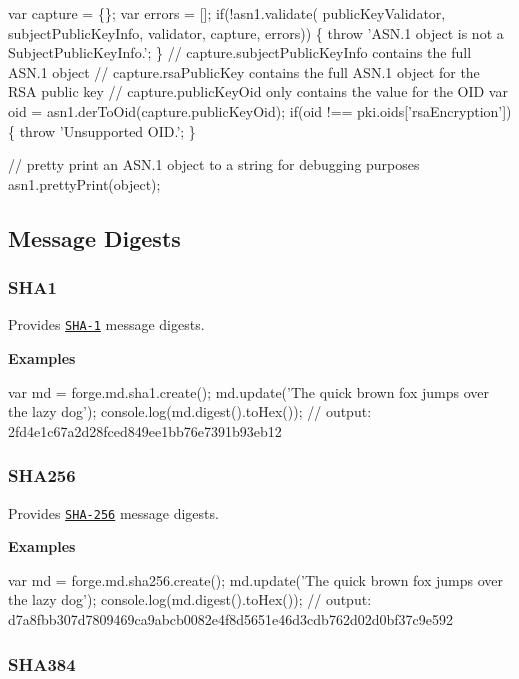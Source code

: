 \begin{DoxyCode}
var capture = \{\};
var errors = [];
if(!asn1.validate(
  publicKeyValidator, subjectPublicKeyInfo, validator, capture, errors)) \{
  throw 'ASN.1 object is not a SubjectPublicKeyInfo.';
\}
// capture.subjectPublicKeyInfo contains the full ASN.1 object
// capture.rsaPublicKey contains the full ASN.1 object for the RSA public key
// capture.publicKeyOid only contains the value for the OID
var oid = asn1.derToOid(capture.publicKeyOid);
if(oid !== pki.oids['rsaEncryption']) \{
  throw 'Unsupported OID.';
\}

// pretty print an ASN.1 object to a string for debugging purposes
asn1.prettyPrint(object);
\end{DoxyCode}
 

 \subsection*{Message Digests}

\label{_sha1}%
 \subsubsection*{S\+H\+A1}

Provides \href{http://en.wikipedia.org/wiki/SHA-1}{\tt S\+H\+A-\/1} message digests.

{\bfseries Examples}


\begin{DoxyCode}
var md = forge.md.sha1.create();
md.update('The quick brown fox jumps over the lazy dog');
console.log(md.digest().toHex());
// output: 2fd4e1c67a2d28fced849ee1bb76e7391b93eb12
\end{DoxyCode}


\label{_sha256}%
 \subsubsection*{S\+H\+A256}

Provides \href{http://en.wikipedia.org/wiki/SHA-256}{\tt S\+H\+A-\/256} message digests.

{\bfseries Examples}


\begin{DoxyCode}
var md = forge.md.sha256.create();
md.update('The quick brown fox jumps over the lazy dog');
console.log(md.digest().toHex());
// output: d7a8fbb307d7809469ca9abcb0082e4f8d5651e46d3cdb762d02d0bf37c9e592
\end{DoxyCode}


\label{_sha384}%
 \subsubsection*{S\+H\+A384}

